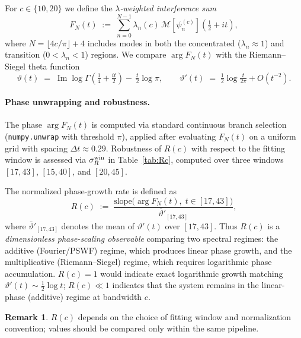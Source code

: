 \documentclass[12pt,a4paper]{amsart}
\theoremstyle{definition}
\newtheorem{remark}[theorem]{Remark}
\begin{document}
For $c \in \{10, 20\}$ we define the \emph{$\lambda$-weighted
interference sum}
\begin{equation}
\label{eq:FN-def}
F_N(t)
\;:=\;
\sum_{n=0}^{N-1}
\lambda_n(c)\,
\mathcal{M}[\psi_n^{(c)}]\!\left(\tfrac{1}{2}+it\right),
\end{equation}
where $N = \lfloor 4c/\pi \rfloor + 4$ includes modes in both
the concentrated ($\lambda_n \approx 1$) and transition
($0 < \lambda_n < 1$) regions.
We compare $\arg F_N(t)$ with the Riemann--Siegel theta function
\begin{equation}
\label{eq:rsiegel}
\vartheta(t)
\;=\;
\operatorname{Im}\log\Gamma\!\!\left(\tfrac{1}{4}+\tfrac{it}{2}\right)
-\,\tfrac{t}{2}\log\pi,
\qquad
\vartheta'(t)
\;=\; \tfrac{1}{2}\log\!\tfrac{t}{2\pi} + O(t^{-2}).
\end{equation}

\paragraph{Phase unwrapping and robustness.}
The phase $\arg F_N(t)$ is computed via standard continuous branch
selection (\texttt{numpy.unwrap} with threshold $\pi$), applied after
evaluating $F_N(t)$ on a uniform grid with spacing
$\Delta t \approx 0.29$. Robustness of $R(c)$ with respect to the
fitting window is assessed via $\sigma_R^{\rm win}$ in
Table~\ref{tab:Rc}, computed over three windows $[17,43]$,
$[15,40]$, and $[20,45]$.

The normalized phase-growth rate is defined as
\begin{equation}
\label{eq:R-def}
R(c)
\;:=\;
\frac{\mathrm{slope}\bigl(\arg F_N(t),\; t \in [17,43]\bigr)}
{\bar{\vartheta}'_{[17,43]}},
\end{equation}
where $\bar{\vartheta}'_{[17,43]}$ denotes the mean of
$\vartheta'(t)$ over $[17,43]$. Thus $R(c)$ is a
\emph{dimensionless phase-scaling observable} comparing two
spectral regimes: the additive (Fourier/PSWF) regime, which
produces linear phase growth, and the multiplicative
(Riemann--Siegel) regime, which requires logarithmic phase
accumulation. $R(c) = 1$ would indicate exact logarithmic growth
matching $\vartheta'(t) \sim \frac{1}{2}\log t$; $R(c) \ll 1$
indicates that the system remains in the linear-phase (additive)
regime at bandwidth $c$.

\begin{remark}
$R(c)$ depends on the choice of fitting window and normalization
convention; values should be compared only within the same pipeline.
\end{remark}
\end{document}
